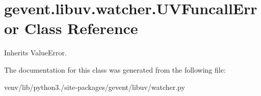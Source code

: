 \hypertarget{classgevent_1_1libuv_1_1watcher_1_1_u_v_funcall_error}{}\section{gevent.\+libuv.\+watcher.\+U\+V\+Funcall\+Error Class Reference}
\label{classgevent_1_1libuv_1_1watcher_1_1_u_v_funcall_error}


Inherits Value\+Error.



The documentation for this class was generated from the following file\+:\begin{DoxyCompactItemize}
\item 
venv/lib/python3./site-\/packages/gevent/libuv/watcher.\+py\end{DoxyCompactItemize}
